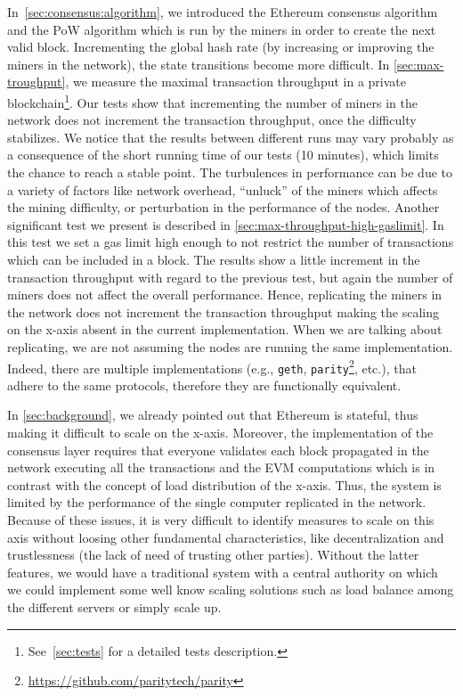 In~\autoref{sec:consensus:algorithm}, we introduced the Ethereum consensus
algorithm and the PoW algorithm which is run by the miners in order to create
the next valid block. Incrementing the global hash rate (by increasing or
improving the miners in the network), the state transitions become more
difficult. In \autoref{sec:max-troughput}, we measure the maximal transaction
throughput in a private blockchain\footnote{See~\autoref{sec:tests} for a
detailed tests description.}. Our tests show that incrementing the number of
miners in the network does not increment the transaction throughput, once the
difficulty stabilizes. We notice that the results between different runs may
vary probably as a consequence of the short running time of our tests (10
minutes), which limits the chance to reach a stable point. The turbulences in
performance can be due to a variety of factors like network overhead,
``unluck'' of the miners which affects the mining difficulty, or
perturbation in the performance of the nodes. Another significant test we
present is described in \autoref{sec:max-throughput-high-gaslimit}. In this test
we set a gas limit high enough to not restrict the number of transactions which
can be included in a block. The results show a little increment in the
transaction throughput with regard to the previous test, but again the number
of miners does not affect the overall performance. Hence, replicating the miners
in the network does not increment the transaction throughput making the scaling
on the x-axis absent in the current implementation. When we are talking about
replicating, we are not assuming the nodes are running the same implementation.
Indeed, there are multiple implementations (e.g., \texttt{geth},
\texttt{parity}\footnote{\url{https://github.com/paritytech/parity}}, etc.),
that adhere to the same protocols, therefore they are functionally equivalent.

In \autoref{sec:background}, we already pointed out that Ethereum is stateful,
thus making it difficult to scale on the x-axis. Moreover, the implementation of
the consensus layer requires that everyone validates each block propagated in
the network executing all the transactions and the EVM computations which is in
contrast with the concept of load distribution of the x-axis. Thus, the system
is limited by the performance of the single computer replicated in the network.
Because of these issues, it is very difficult to identify measures to scale on
this axis without loosing other fundamental characteristics, like
decentralization and trustlessness (the lack of need of trusting other parties).
Without the latter features, we would have a traditional system with a central
authority on which we could implement some well know scaling solutions such as
load balance among the different servers or simply scale up.
